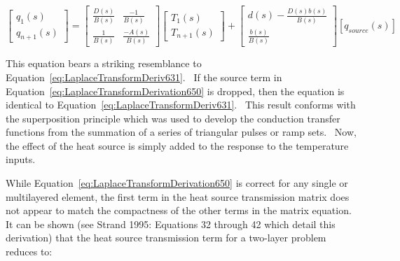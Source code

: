 \begin{equation}
\left[ {\begin{array}{*{20}{c}}{{q_1}\left( s \right)}\\ {{q_{n + 1}}\left( s \right)}\end{array}} \right] = \left[ {\begin{array}{*{20}{c}}{\frac{{D\left( s \right)}}{{B\left( s \right)}}}&{\frac{{ - 1}}{{B\left( s \right)}}}\\ {\frac{1}{{B\left( s \right)}}}&{\frac{{ - A\left( s \right)}}{{B\left( s \right)}}}\end{array}} \right]\left[ {\begin{array}{*{20}{c}}{{T_1}\left( s \right)}\\ {{T_{n + 1}}\left( s \right)}\end{array}} \right] + \left[ {\begin{array}{*{20}{c}}{d\left( s \right) - \frac{{D\left( s \right)b\left( s \right)}}{{B\left( s \right)}}}\\ {\frac{{b\left( s \right)}}{{B\left( s \right)}}}\end{array}} \right]\left[ {{q_{source}}\left( s \right)} \right]
\label{eq:LaplaceTransformDerivation650}
\end{equation}

This equation bears a striking resemblance to Equation~\ref{eq:LaplaceTransformDeriv631}.~ If the source term in Equation~\ref{eq:LaplaceTransformDerivation650} is dropped, then the equation is identical to Equation~\ref{eq:LaplaceTransformDeriv631}.~ This result conforms with the superposition principle which was used to develop the conduction transfer functions from the summation of a series of triangular pulses or ramp sets.~ Now, the effect of the heat source is simply added to the response to the temperature inputs.

While Equation~\ref{eq:LaplaceTransformDerivation650} is correct for any single or multilayered element, the first term in the heat source transmission matrix does not appear to match the compactness of the other terms in the matrix equation.~ It can be shown (see Strand 1995: Equations 32 through 42 which detail this derivation) that the heat source transmission term for a two-layer problem reduces to:

